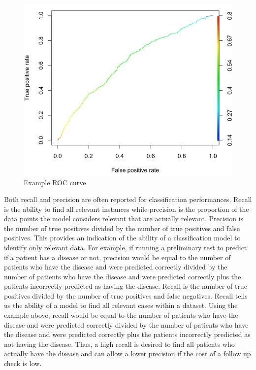 \documentclass{llncs}
\begin{document}
\begin{figure}
\centering
\includegraphics[scale=0.60]{roc.png}
\caption{Example ROC curve}
\label{fig:roc}
\end{figure}

Both recall and precision are often reported for classification performances.  Recall is the ability to find all relevant instances while precision is the proportion of the data points the model considers relevant that are actually relevant.  Precision is the number of true positives divided by the number of true positives and false positives.  This provides an indication of the ability of a classification model to identify only relevant data.  For example, if running a preliminary test to predict if a patient has a disease or not, precision would be equal to the number of patients who have the disease and were predicted correctly divided by the number of patients who have the disease and were predicted correctly plus the patients incorrectly predicted as having the disease.  Recall is the number of true positives divided by the number of true positives and false negatives. Recall tells us the ability of a model to find all relevant cases within a dataset.  Using the example above, recall would be equal to the number of patients who have the disease and were predicted correctly divided by the number of patients who have the disease and were predicted correctly plus the patients incorrectly predicted as not having the disease. Thus, a high recall is desired to find all patients who actually have the disease and can allow a lower precision if the cost of a follow up check is low.
\end{document}
